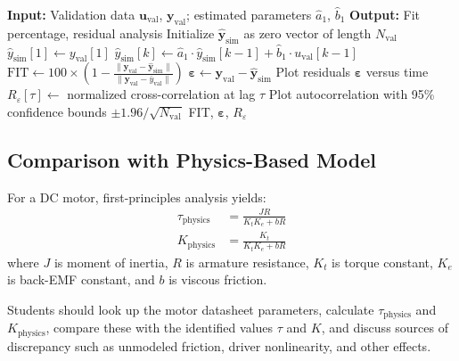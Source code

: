 \begin{algorithm}
\caption{Model Validation}
\label{alg:sysid_validation}
\begin{algorithmic}[1]
\State \textbf{Input:} Validation data $\mathbf{u}_{\text{val}}$, $\mathbf{y}_{\text{val}}$; estimated parameters $\hat{a}_1$, $\hat{b}_1$
\State \textbf{Output:} Fit percentage, residual analysis
\State
\State {}
\State Initialize $\hat{\mathbf{y}}_{\text{sim}}$ as zero vector of length $N_{\text{val}}$
\State $\hat{y}_{\text{sim}}[1] \gets y_{\text{val}}[1]$ 
    \State $\hat{y}_{\text{sim}}[k] \gets \hat{a}_1 \cdot \hat{y}_{\text{sim}}[k-1] + \hat{b}_1 \cdot u_{\text{val}}[k-1]$
\EndFor
\State
\State {}
\State $\text{FIT} \gets 100 \times \left(1 - \frac{\|\mathbf{y}_{\text{val}} - \hat{\mathbf{y}}_{\text{sim}}\|}{\|\mathbf{y}_{\text{val}} - \bar{y}_{\text{val}}\|}\right)$
\State
\State {}
\State $\boldsymbol{\varepsilon} \gets \mathbf{y}_{\text{val}} - \hat{\mathbf{y}}_{\text{sim}}$
\State Plot residuals $\boldsymbol{\varepsilon}$ versus time
\State
\State {}
    \State $R_\varepsilon[\tau] \gets$ normalized cross-correlation at lag $\tau$
\EndFor
\State Plot autocorrelation with 95\% confidence bounds $\pm 1.96/\sqrt{N_{\text{val}}}$
\State
\State {}
\State \Return FIT, $\boldsymbol{\varepsilon}$, $R_\varepsilon$
\end{algorithmic}
\end{algorithm}

\subsection{Comparison with Physics-Based Model}

For a DC motor, first-principles analysis yields:
\begin{align}
\tau_\text{physics} &= \frac{JR}{K_t K_e + bR} \label{eq:tau_physics}\\
K_\text{physics} &= \frac{K_t}{K_t K_e + bR} \label{eq:k_physics}
\end{align}
where $J$ is moment of inertia, $R$ is armature resistance, $K_t$ is torque constant, $K_e$ is back-EMF constant, and $b$ is viscous friction.

Students should look up the motor datasheet parameters, calculate $\tau_\text{physics}$ and $K_\text{physics}$, compare these with the identified values $\tau$ and $K$, and discuss sources of discrepancy such as unmodeled friction, driver nonlinearity, and other effects.

